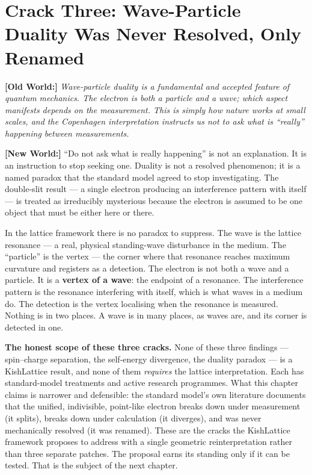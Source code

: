 \documentclass[11pt, letterpaper, openany]{book}
\newcommand{\oldworld}[1]{\noindent\textbf{\color{goldseal}[Old World:]}
  \textit{#1}\medskip}
\newcommand{\newworldcmd}[1]{\noindent\textbf{\color{kishblue}[New World:]}
  #1\medskip}
\begin{document}
\section{Crack Three: Wave-Particle Duality Was Never Resolved, Only Renamed}
 
\oldworld{Wave-particle duality is a fundamental and accepted feature of
quantum mechanics. The electron is both a particle and a wave; which
aspect manifests depends on the measurement. This is simply how nature
works at small scales, and the Copenhagen interpretation instructs us not
to ask what is ``really'' happening between measurements.}
 
\newworldcmd{``Do not ask what is really happening'' is not an explanation.
It is an instruction to stop seeking one. Duality is not a resolved
phenomenon; it is a named paradox that the standard model agreed to stop
investigating. The double-slit result --- a single electron producing an
interference pattern with itself --- is treated as irreducibly mysterious
because the electron is assumed to be one object that must be either here
or there.
 
In the lattice framework there is no paradox to suppress. The wave is the
lattice resonance --- a real, physical standing-wave disturbance in the
medium. The ``particle'' is the vertex --- the corner where that resonance
reaches maximum curvature and registers as a detection. The electron is
not both a wave and a particle. It is a \textbf{vertex of a wave}: the
endpoint of a resonance. The interference pattern is the resonance
interfering with itself, which is what waves in a medium do. The detection
is the vertex localising when the resonance is measured. Nothing is in two
places. A wave is in many places, as waves are, and its corner is detected
in one.}
 
\begin{warningbox}
\textbf{The honest scope of these three cracks.} None of these three
findings --- spin--charge separation, the self-energy divergence, the
duality paradox --- is a KishLattice result, and none of them
\emph{requires} the lattice interpretation. Each has standard-model
treatments and active research programmes. What this chapter claims is
narrower and defensible: the standard model's own literature documents
that the unified, indivisible, point-like electron breaks down under
measurement (it splits), breaks down under calculation (it diverges),
and was never mechanically resolved (it was renamed). These are the
cracks the KishLattice framework proposes to address with a single
geometric reinterpretation rather than three separate patches. The
proposal earns its standing only if it can be tested. That is the
subject of the next chapter.
\end{warningbox}
 
\end{document}
